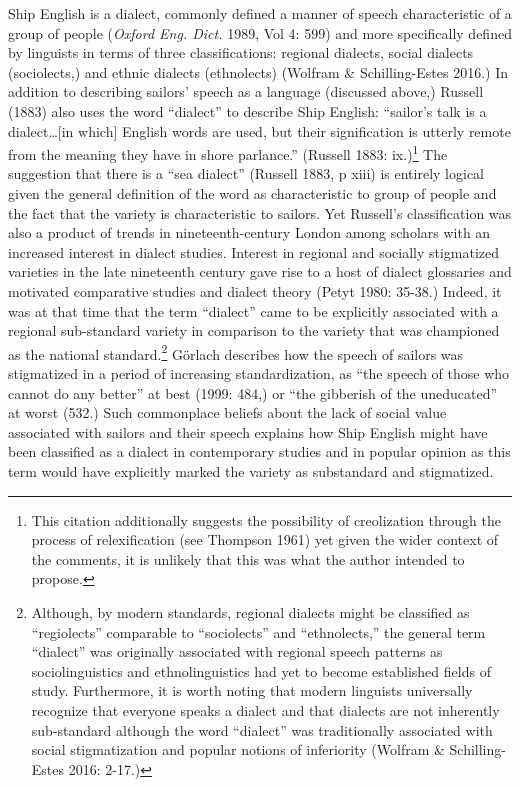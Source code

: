\documentclass[12pt]{article}
\newcommand\textstylereferencetext[1]{#1}
\newenvironment{styleStandard}{\renewcommand\baselinestretch{1.0}\setlength\leftskip{0cm}\setlength\rightskip{0cm plus 1fil}\setlength\parindent{0cm}\setlength\parfillskip{0pt plus 1fil}\setlength\parskip{0in plus 1pt}\writerlistparindent\writerlistleftskip\leavevmode\normalfont\normalsize\writerlistlabel\ignorespaces}{\unskip\vspace{0in plus 1pt}\par}
\newcommand\writerlistleftskip{}
\newcommand\writerlistparindent{}
\newcommand\writerlistlabel{}
\begin{document}
\begin{styleStandard}
Ship English is a dialect, commonly defined a manner of speech characteristic of a group of people (\textit{Oxford Eng. Dict. }1989, Vol 4: 599) and more specifically defined by linguists in terms of three classifications: regional dialects, social dialects (sociolects,) and ethnic dialects (ethnolects) (Wolfram \& Schilling-Estes 2016.) In addition to describing sailors’ speech as a language (discussed above,) Russell (1883) also uses the word “dialect” to describe Ship English: “sailor’s talk is a dialect…[in which] English words are used, but their signification is utterly remote from the meaning they have in shore parlance.” (Russell 1883: ix.)\footnote{ This citation additionally suggests the possibility of creolization through the process of relexification (see Thompson 1961) yet given the wider context of the comments, it is unlikely that this was what the author intended to propose. } The suggestion that there is a “sea dialect” (Russell 1883, p xiii) is entirely logical given the general definition of the word as characteristic to group of people and the fact that the variety is characteristic to sailors. Yet Russell’s classification was also a product of trends in nineteenth-century London among scholars with an increased interest in dialect studies. Interest in regional and socially stigmatized varieties in the late nineteenth century gave rise to a host of dialect glossaries \textstylereferencetext{and motivated comparative studies and dialect theory (Petyt 1980: 35-38.) Indeed, it was at that time that the term “dialect” came to be explicitly associated with a regional sub-standard variety in comparison to the variety that was championed as the national standard.}\footnote{ \textstylereferencetext{Although}, by modern standards, regional dialects might be classified as “regiolects” \textstylereferencetext{comparable to “sociolects” and “ethnolects,” the general term “dialect” was originally} associated with regional speech patterns as sociolinguistics and ethnolinguistics had yet to become established fields of study. Furthermore,\textstylereferencetext{ it is worth noting that modern }linguists universally recognize that everyone speaks a dialect and that dialects are not inherently sub-standard although the word “dialect” was traditionally associated with social stigmatization and popular notions of inferiority (Wolfram \& Schilling-Estes 2016: 2-17.) }\textstylereferencetext{ }Görlach describes how\textstylereferencetext{ the }speech of sailors was stigmatized in a period of increasing standardization, as “the speech of those who cannot do any better” at best (1999: 484,) or “the gibberish of the uneducated” at worst (532.)\textstylereferencetext{ Such commonplace beliefs about the lack of social value associated with sailors and their speech explains how Ship English might have been classified as a dialect in contemporary studies and in popular opinion as this term would have explicitly marked the variety as substandard and stigmatized.}
\end{styleStandard}
\end{document}
